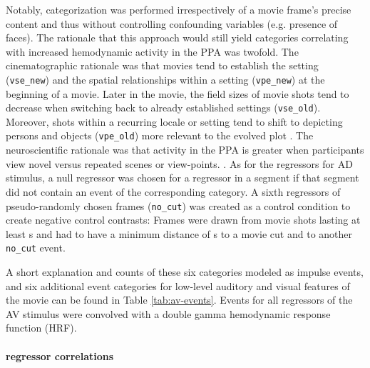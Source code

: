 \documentclass[english]{article}
\begin{document}
Notably, categorization was performed irrespectively of a movie frame's precise
content and thus without controlling confounding variables (e.g. presence of
faces).
The rationale that this approach would still yield categories correlating with
increased hemodynamic activity in the PPA was twofold.
The cinematographic rationale was that movies tend to establish the setting
(\texttt{vse\_new}) and the spatial relationships within a setting
(\texttt{vpe\_new}) at the beginning of a movie.
Later in the movie, the field sizes of movie shots tend to decrease when
switching back to already established settings (\texttt{vse\_old}).
Moreover, shots within a recurring locale or setting tend to shift to depicting
persons and objects (\texttt{vpe\_old}) more relevant to the evolved plot
\citep{brown2012cinematography, mercado2011filmmakers}.
The neuroscientific rationale was that activity in the PPA is greater when
participants view novel versus repeated scenes or view-points.
\citep{epstein1999parahippocampal, grill2006repetition}.
As for the regressors for AD stimulus, a null regressor was chosen for a
regressor in a segment if that segment did not contain an event of the
corresponding category.
A sixth regressors of pseudo-randomly chosen frames (\texttt{no\_cut}) was
created as a control condition to create negative control contrasts:
Frames were drawn from movie shots lasting at least \unit[20]{s} and had to have
a minimum distance of \unit[10]{s} to a movie cut and to another
\texttt{no\_cut} event.


A short explanation and counts of these six categories modeled as impulse
events, and six additional event categories for low-level auditory and visual
features of the movie can be found in Table \ref{tab:av-events}.
Events for all regressors of the AV stimulus were convolved with a
double gamma hemodynamic response function (HRF).


\paragraph{regressor correlations}
\end{document}
